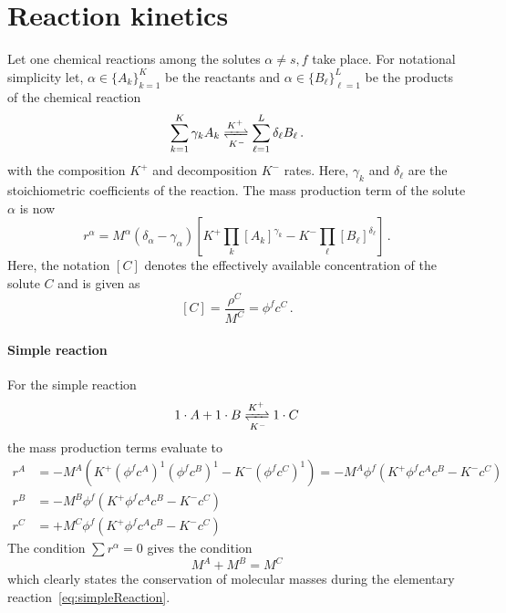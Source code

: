 \documentclass[a4paper,DIV=12,10pt]{scrartcl}
\begin{document}
\section{Reaction kinetics}
\label{sec:reaction}
Let one chemical reactions among the solutes $\alpha \neq s, f$ take
place. For notational simplicity let, $\alpha \in \{ A_k \}_{k = 1}^K$ be the
reactants and $\alpha \in \{ B_\ell \}_{\ell=1}^L$ be the products of the
chemical reaction
\begin{equation}
  \label{eq:reaction}
  \sum_{k=1}^K \gamma_k A_k \xrightleftharpoons[K^-]{K^+} 
  \sum_{\ell=1}^L \delta_\ell B_\ell \,.
\end{equation}
with the composition $K^+$ and decomposition $K^-$ rates. Here,
$\gamma_k$ and $\delta_\ell$ are the stoichiometric coefficients of the
reaction. 
The mass production term of the solute $\alpha$ is now
\begin{equation}
  \label{eq:massProduct}
  r^\alpha = M^\alpha \left( \delta_\alpha - \gamma_\alpha \right) 
  \left[ K^+ \prod_{k} [A_k]^{\gamma_k} - 
    K^- \prod_{\ell} [B_\ell]^{\delta_\ell} \right]\,.
\end{equation}
Here, the notation $[ C ]$ denotes the effectively available concentration of
the solute $C$ and is given as
\begin{equation}
  \label{eq:effectiveConcentration}
  [C] = \frac{\rho^C}{M^C} = \phi^f c^C \,.
\end{equation}

\paragraph{Simple reaction}
For the simple reaction
\begin{equation}
  \label{eq:simpleReaction}
  1 \cdot A + 1 \cdot B \xrightleftharpoons[K^-]{K^+}  1 \cdot C
\end{equation}
the mass production terms evaluate to
\begin{equation}
  \label{eq:simpleMassProduct}
  \begin{aligned}
    r^A &= -M^A \left( K^+ (\phi^f c^A)^1 (\phi^f c^B)^1 - K^- (\phi^f c^C)^1
    \right) = -M^A \phi^f \left( K^+ \phi^f c^A c^B - K^- c^C \right)\\
    r^B &=  -M^B \phi^f \left( K^+ \phi^f c^A c^B - K^- c^C \right)\\
    r^C &=  +M^C \phi^f \left( K^+ \phi^f c^A c^B - K^- c^C \right)
  \end{aligned}
\end{equation}
The condition $\sum r^\alpha = 0$ gives the condition
\begin{equation}
  \label{eq:control}
  M^A + M^B = M^C
\end{equation}
which clearly states the conservation of molecular masses during the
elementary reaction~\eqref{eq:simpleReaction}. 
\end{document}
